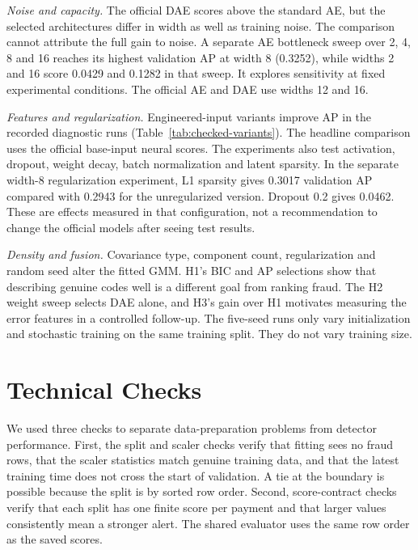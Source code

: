 \textit{Noise and capacity.} The official DAE scores above the standard AE, but the selected architectures differ in width as well as training noise. The comparison cannot attribute the full gain to noise. A separate AE bottleneck sweep over 2, 4, 8 and 16 reaches its highest validation AP at width 8 (0.3252), while widths 2 and 16 score 0.0429 and 0.1282 in that sweep. It explores sensitivity at fixed experimental conditions. The official AE and DAE use widths 12 and 16.

\textit{Features and regularization.} Engineered-input variants improve AP in the recorded diagnostic runs (Table~\ref{tab:checked-variants}). The headline comparison uses the official base-input neural scores. The experiments also test activation, dropout, weight decay, batch normalization and latent sparsity. In the separate width-8 regularization experiment, L1 sparsity gives 0.3017 validation AP compared with 0.2943 for the unregularized version. Dropout 0.2 gives 0.0462. These are effects measured in that configuration, not a recommendation to change the official models after seeing test results.

\textit{Density and fusion.} Covariance type, component count, regularization and random seed alter the fitted GMM. H1's BIC and AP selections show that describing genuine codes well is a different goal from ranking fraud. The H2 weight sweep selects DAE alone, and H3's gain over H1 motivates measuring the error features in a controlled follow-up. The five-seed runs only vary initialization and stochastic training on the same training split. They do not vary training size.

\section{Technical Checks}
\label{sec:round-checks}
We used three checks to separate data-preparation problems from detector performance. First, the split and scaler checks verify that fitting sees no fraud rows, that the scaler statistics match genuine training data, and that the latest training time does not cross the start of validation. A tie at the boundary is possible because the split is by sorted row order. Second, score-contract checks verify that each split has one finite score per payment and that larger values consistently mean a stronger alert. The shared evaluator uses the same row order as the saved scores.

